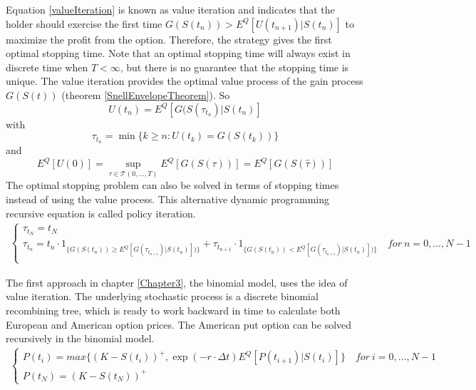Equation \eqref{valueIteration} is known as value iteration and indicates that the holder should exercise the first time $G(S(t_n))> E^Q[U(t_{n+1})|S(t_n)]$ to maximize the profit from the option. Therefore, the strategy gives the first optimal stopping time. Note that an optimal stopping time will always exist in discrete time when $T<\infty$, but there is no guarantee that the stopping time is unique. The value iteration provides the optimal value process of the gain process $G(S(t))$ (theorem \ref{SnellEnvelopeTheorem}). So 
$$U(t_n)=E^Q[G(S(\tau_{t_n})|S(t_n)]$$ with 
$$\tau_{t_n}=\min \{ k \geq n : U(t_k) = G(S(t_k)) \}$$ and 
$$E^Q[U(0)]= \sup_{\tau \in \mathcal{T}(0,\ldots, T)} E^Q[G(S(\tau))]=E^Q[G(S(\hat{\tau}))]$$ 
The optimal stopping problem can also be solved in terms of stopping times instead of using the value process. This alternative dynamic programming recursive equation is called policy iteration.
\begin{equation}\label{policyIteration}
\begin{split}
\begin{cases}
          \tau_{t_N} = t_N\\
          \tau_{t_n} = t_n \cdot 1_{\{G(S(t_n)) \geq E^Q[G(\tau_{t_{n+1}})|S(t_n)])\}} + \tau_{t_{n+1}} \cdot 1_{\{G(S(t_n)) < E^Q[G(\tau_{t_{n+1}})|S(t_n)])\}} \quad for \ n={0,\ldots,N-1} \\ 
\end{cases}
\end{split}
\end{equation}

The first approach in chapter \ref{Chapter3}, the binomial model, uses the idea of value iteration. The underlying stochastic process is a discrete binomial recombining tree, which is ready to work backward in time to calculate both European and American option prices. The American put option can be solved recursively in the binomial model.
\begin{equation}\label{BellmanEq}
\begin{split}
\begin{cases}
          P(t_i) = max\{ (K-S(t_i))^+, \exp(-r\cdot \Delta t) E^Q[P(t_{i+1})|S(t_i)]\} \quad for \ i={0,\ldots,N-1} \\
          P(t_N) = (K-S(t_N))^+ 
\end{cases}
\end{split}
\end{equation}

